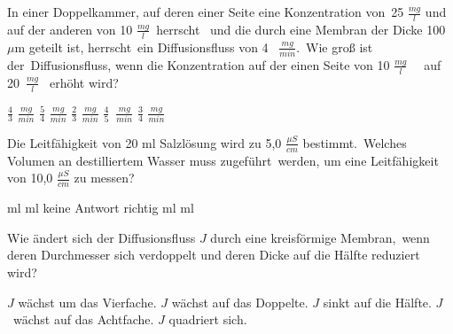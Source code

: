 \documentclass[11pt]{exam}
\begin{document}
\setlength{\voffset}{-0.5in}
\setlength{\headsep}{5pt}

\hspace{2mm}
 \hspace{5mm}
\vspace{4mm}

\begin{questions}

\question In einer Doppelkammer, auf deren einer Seite eine Konzentration von 25 \(\frac{mg}{l} \) und auf der anderen von 10 \(  \frac{mg}{l} \) herrscht  und die durch eine Membran der Dicke 100 \(\mu \)m geteilt ist, herrscht ein Diffusionsfluss von 4  \( \frac{mg}{min}\). Wie groß ist der Diffusionsfluss, wenn die Konzentration auf der einen Seite von 10 \(  \frac{mg}{l} \)   auf 20 \(  \frac{mg}{l} \)  erhöht wird?

\begin{choices}
	\choice \( \frac{4}{3} \) \( \frac{mg}{min} \)
	\choice \( \frac{5}{4} \) \( \frac{mg}{min} \)
	\choice \( \frac{2}{3} \) \( \frac{mg}{min} \)
	\choice \( \frac{4}{5} \) \( \frac{mg}{min} \)
	\choice \( \frac{3}{4} \) \( \frac{mg}{min} \)
\end{choices}

\vspace{3mm}\question Die Leitfähigkeit von 20 ml Salzlösung wird zu 5,0 \( \frac{\mu S}{cm} \) bestimmt. Welches Volumen an destilliertem Wasser muss zugeführt werden, um eine Leitfähigkeit von 10,0 \( \frac{\mu S}{cm} \) zu messen?

\begin{choices}
	 ml
	 ml
	\choice keine Antwort richtig
	 ml
	 ml
\end{choices}

\vspace{3mm}\question Wie ändert sich der Diffusionsfluss \( J \) durch eine kreisförmige Membran, wenn deren Durchmesser sich verdoppelt und deren Dicke auf die Hälfte reduziert wird?

\begin{choices}
	\choice \( J \) wächst um das Vierfache.
	\choice \( J \) wächst auf das Doppelte.
	\choice \( J \) sinkt auf die Hälfte.
	\choice \( J \) wächst auf das Achtfache.
	\choice \( J \) quadriert sich.
\end{choices}


\end{questions}
\end{document}
